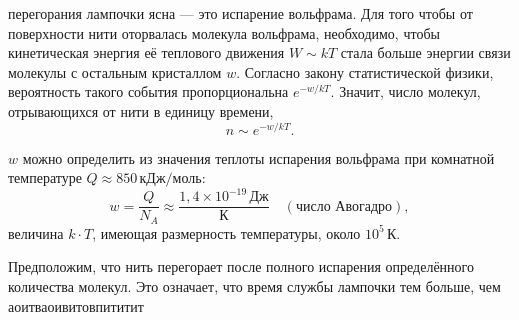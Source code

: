 \begin{multicols}{2}
         перегорания лампочки ясна — это испарение вольфрама. Для того чтобы от поверхности нити оторвалась молекула вольфрама, необходимо, чтобы кинетическая энергия её теплового движения $W \sim kT$ стала больше энергии связи молекулы с остальным кристаллом $w$. Согласно закону статистической физики, вероятность такого события пропорциональна $e^{-w/kT}$. Значит, число молекул, отрывающихся от нити в единицу времени,
        \[ n \sim e^{-w/kT}.\]
        
         $w$ можно определить из значения теплоты испарения вольфрама при комнатной температуре $Q \approx 850 \, \text{кДж/моль}$:
        \[ w = \frac{Q}{N_A} \approx \frac{1,4 \times 10^{-19} \, \text{Дж}}{\text{К}} \quad (\text{число Авогадро}),\]
        величина $k \cdot T$, имеющая размерность температуры, около $10^5 \, \text{К}$.
        
        Предположим, что нить перегорает после полного испарения определённого количества молекул. Это означает, что время службы лампочки тем больше, чем
        аоитваоивитовпититит
    \end{multicols} 